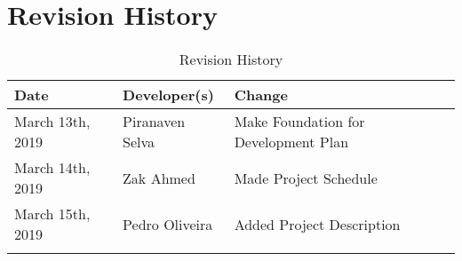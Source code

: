 \documentclass{article}
\begin{document}
\section{Revision History}
\begin{table}[hp]
\caption{Revision History} \label{TblRevisionHistory}
\begin{tabularx}{\textwidth}{llX}
\toprule
\textbf{Date} & \textbf{Developer(s)} & \textbf{Change}\\
\midrule
March 13th, 2019 &Piranaven Selva & Make Foundation for Development Plan\\
March 14th, 2019 &Zak Ahmed & Made Project Schedule\\
March 15th, 2019 &Pedro Oliveira & Added Project Description\\
\\
\bottomrule
\end{tabularx}
\end{table}
\end{document}
